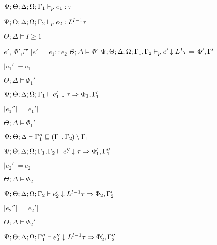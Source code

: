 {{{    $\Psi ; \Theta ; \Delta ; \Omega ; \Gamma_1\vdash_p e_1 : \tau$
   
    $\Psi ; \Theta ; \Delta ; \Omega ; \Gamma_2\vdash_p e_2 : L^{I-1} \tau$
   
    $\Theta ; \Delta \vDash I \geq 1$
  }{
   $e'$, $\Phi'$,$\Gamma'$  
  }{
   $|e'| = e_1 :: e_2$
  }{
   $\Theta ; \Delta \vDash \Phi'$  
  }{
   $\Psi ; \Theta ; \Delta ; \Omega ; \Gamma_1,\Gamma_2 \vdash_p e' \downarrow L^I \tau \Rightarrow \Phi',\Gamma'$  
  }
  
  
   $|e_1'| = e_1$
  
   $\Theta ; \Delta \vDash \Phi_1'$
  
   $\Psi ; \Theta ; \Delta ; \Omega ; \Gamma_1 \vdash e_1' \downarrow \tau \Rightarrow \Phi_1,\Gamma_1'$
  
  
   $|e_1''| = |e_1'|$
  
   $\Theta ; \Delta \vDash \Phi_1'$
  
   $\Psi ; \Theta ; \Delta \vdash \Gamma_1'' \sqsubseteq (\Gamma_1,\Gamma_2) \setminus \Gamma_1$
  
   $\Psi ; \Theta ; \Delta ; \Omega ; \Gamma_1,\Gamma_2 \vdash e_1'' \downarrow \tau \Rightarrow \Phi_1',\Gamma_1''$
  
  
   $|e_2'| = e_2$
  
   $\Theta ; \Delta \vDash \Phi_2$
  
   $\Psi ; \Theta ; \Delta ; \Omega ; \Gamma_2 \vdash e_2' \downarrow L^{I-1} \tau \Rightarrow \Phi_2,\Gamma_2'$
  
  
   $|e_2''| = |e_2'|$
  
   $\Theta ; \Delta \vDash \Phi_2'$
  
   $\Psi ; \Theta ; \Delta ; \Omega ; \Gamma_1'' \vdash e_2'' \downarrow L^{I-1} \tau \Rightarrow \Phi_2',\Gamma_2''$
  
  
}}
